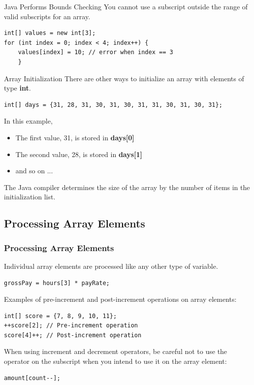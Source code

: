 \documentclass[11pt]{beamer}
\begin{document}
\begin{frame}[fragile]{Java Performs Bounds Checking}
    You cannot use a subscript outside the range of valid subscripts for an array.
    \begin{lstlisting}
int[] values = new int[3];
for (int index = 0; index < 4; index++) {
    values[index] = 10; // error when index == 3
    }
    \end{lstlisting}
\end{frame}

\begin{frame}[fragile]{Array Initialization}
    There are other ways to initialize an array with elements of type \textbf{int}.
    \begin{lstlisting}
int[] days = {31, 28, 31, 30, 31, 30, 31, 31, 30, 31, 30, 31};
    \end{lstlisting}
    In this example,
\begin{itemize}
    \item The first value, 31, is stored in \textbf{days[0]}
    \item The second value, 28, is stored in \textbf{days[1]}
    \item and so on ... 
\end{itemize}
    The Java compiler determines the size of the array by the number of items in the initialization list.
\end{frame}

\subsection{Processing Array Elements}
\begin{frame}[fragile]
    \frametitle{Processing Array Elements}
    Individual array elements are processed like any other type of variable.
    \begin{lstlisting}
grossPay = hours[3] * payRate;
    \end{lstlisting}
    Examples of pre-increment and post-increment operations on array elements:
    \begin{lstlisting}
int[] score = {7, 8, 9, 10, 11};
++score[2]; // Pre-increment operation
score[4]++; // Post-increment operation
    \end{lstlisting}
    When using increment and decrement operators, be careful not to use the operator on the subscript when you intend to use it on the array element:
    \begin{lstlisting}
amount[count--];
    \end{lstlisting}
\end{frame}
\end{document}
